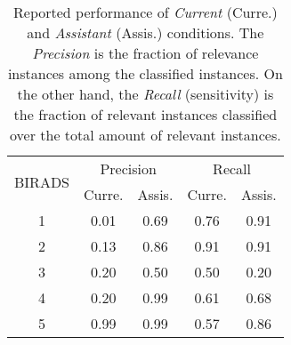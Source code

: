 \begin{table}[htbp]
\centering
\begin{tabular}{|c|c|c|c|c|}
\hline
\multirow{2}{*}{BIRADS} & \multicolumn{2}{c|}{Precision} & \multicolumn{2}{c|}{Recall}   \\ \cline{2-5} 
                        & Curre.          & Assis.       & Curre.         & Assis.    \\ \hline
1                       & 0.01            & 0.69         & 0.76           & 0.91         \\ \hline
2                       & 0.13            & 0.86         & 0.91           & 0.91         \\ \hline
3                       & 0.20            & 0.50         & 0.50           & 0.20         \\ \hline
4                       & 0.20            & 0.99         & 0.61           & 0.68         \\ \hline
5                       & 0.99            & 0.99         & 0.57           & 0.86         \\ \hline
\end{tabular}
\caption{Reported performance of {\it Current} (Curre.) and {\it Assistant} (Assis.) conditions. The {\it Precision} is the fraction of relevance instances among the classified instances. On the other hand, the {\it Recall} (sensitivity) is the fraction of relevant instances classified over the total amount of relevant instances.}
\label{tab:tab004}
\end{table}